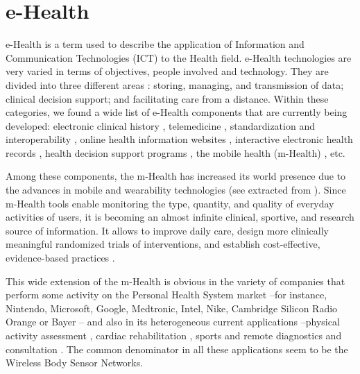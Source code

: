 \section{e-Health}

e-Health is a term used to describe the application of Information and Communication Technologies (ICT) to the Health field. e-Health technologies are very varied in terms of objectives, people involved and technology. They are divided into three different areas \cite{black2011impact}: storing, managing, and transmission of data; clinical decision support; and facilitating care from a distance. Within these categories, we found a wide list of e-Health components that are currently being developed: electronic clinical history \cite{schiff2010can}, telemedicine \cite{anker2011telemedicine}, standardization and interoperability \cite{kanter2012importance,aragues2011trends}, online health information websites \cite{van2010definition}, interactive electronic health records \cite{archer2011personal}, health decision support programs \cite{romano2011electronic}, the mobile health (m-Health) \cite{kay2011mhealth}, etc.

Among these components, the m-Health has increased its world presence due to the advances in mobile and wearability technologies (see  extracted from \cite{pawar2012framework}). Since m-Health tools enable monitoring the type, quantity, and quality of everyday activities of users, it is becoming an almost infinite clinical, sportive, and research source of information. It allows to improve daily care, design more clinically meaningful randomized trials of interventions, and establish cost-effective, evidence-based practices \cite{dobkin2011promise}.

This wide extension of the m-Health is obvious in the variety of companies that perform some  activity on the Personal Health System market --for instance, Nintendo, Microsoft, Google, Medtronic, Intel, Nike, Cambridge Silicon Radio Orange or Bayer \cite{baum2013market}--  and also in its heterogeneous current applications --physical activity assessment \cite{wuttidittachotti2014mhealth, o2013current}, cardiac rehabilitation \cite{pfaeffli2012mhealth}, sports \cite{verhagen2013peek} and remote diagnostics and consultation \cite{godoy2013virtual}. The common denominator in all these applications seem to be the Wireless Body Sensor Networks.

